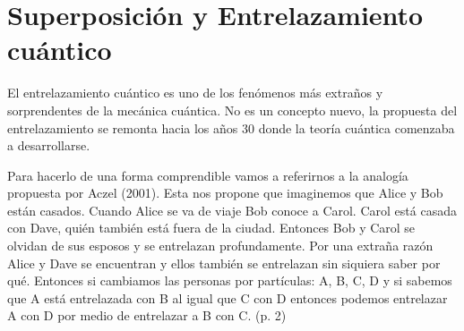 \documentclass[11pt,a4paper]{article}
\begin{document}
\section*{Superposición y Entrelazamiento cuántico}

El entrelazamiento cuántico es uno de los fenómenos más extraños y sorprendentes de la mecánica cuántica. No es un concepto nuevo, la propuesta del entrelazamiento se remonta hacia los años 30 donde la teoría cuántica comenzaba a desarrollarse. 

Para hacerlo de una forma comprendible vamos a referirnos a la analogía propuesta por Aczel (2001). Esta nos propone que imaginemos que Alice y Bob están casados. Cuando Alice se va de viaje Bob conoce a Carol. Carol está casada con Dave, quién también está fuera de la ciudad. Entonces Bob y Carol se olvidan de sus esposos y se entrelazan profundamente. Por una extraña razón Alice y Dave se encuentran y ellos también se entrelazan sin siquiera saber por qué. Entonces si cambiamos las personas por partículas: A, B, C, D y si sabemos que A está entrelazada con B al igual que C con D  entonces podemos entrelazar A con D por medio de entrelazar a B con C. (p. 2)
\end{document}
